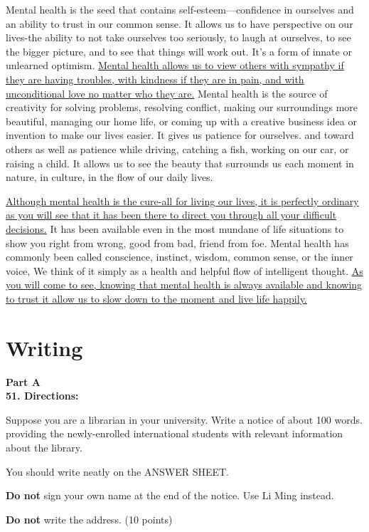 Mental health is the seed that contains self-esteem---confidence in
ourselves and an ability to trust in our common sense. It allows us to
have perspective on our lives-the ability to not take ourselves too
seriously, to laugh at ourselves, to see the bigger picture, and to
see that things will work out. It's a form of innate or unlearned
optimism. \transnum \uline{Mental health allows us to view others with
	sympathy if they are having troubles, with kindness if they are in
	pain, and with unconditional love no matter who they are.} Mental
health is the source of creativity for solving problems, resolving
conflict, making our surroundings more beautiful, managing our home
life, or coming up with a creative business idea or invention to make
our lives easier. It gives us patience for ourselves. and toward
others as well as patience while driving, catching a fish, working on
our car, or raising a child. It allows us to see the beauty that
surrounds us each moment in nature, in culture, in the flow of our
daily lives.

\transnum \uline{Although mental health is the cure-all for living our
	lives, it is perfectly ordinary as you will see that it has been there
	to direct you through all your difficult decisions.} It has been
available even in the most mundane of life situations to show you right
from wrong, good from bad, friend from foe. Mental health has
commonly been called conscience, instinct, wisdom, common sense, or
the inner voice, We think of it simply as a health and helpful flow of
intelligent thought. \transnum \uline{As you will come to see, knowing
	that mental health is always available and knowing to trust it allow us
	to slow down to the moment and live life happily.}


\section{Writing}


\noindent
\textbf{Part A}\\
\textbf{ 51. Directions:}

Suppose you are a librarian in your university. Write a notice of
about 100 words. providing the newly-enrolled international students
with relevant information about the library.

You should write neatly on the ANSWER SHEET.

\textbf{Do not} sign your own name at the end of the notice. Use Li
Ming instead.

\textbf{Do not} write the address. (10 points)


